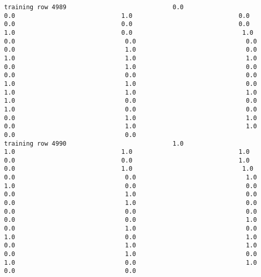 \documentclass[11pt]{article}
\begin{document}
\begin{verbatim}
training row 4989                             0.0                             0.0                             1.0                             0.0                             0.0                             0.0                             0.0                             1.0                             0.0                              1.0                              0.0                              0.0                              0.0                              0.0                              1.0                              0.0                              1.0                              1.0                              1.0                              0.0                              1.0                              0.0                              0.0                              0.0                              0.0                              1.0                              1.0                              0.0                              1.0                              1.0                              1.0                              1.0                              0.0                              0.0                              1.0                              0.0                              0.0                              0.0                              1.0                              1.0                              0.0                              1.0                              1.0                              0.0                              0.0
training row 4990                             1.0                             1.0                             1.0                             1.0                             0.0                             0.0                             1.0                             0.0                             1.0                              1.0                              0.0                              0.0                              1.0                              1.0                              0.0                              0.0                              0.0                              1.0                              0.0                              0.0                              1.0                              0.0                              0.0                              0.0                              0.0                              0.0                              0.0                              1.0                              0.0                              1.0                              0.0                              1.0                              0.0                              1.0                              0.0                              1.0                              1.0                              0.0                              1.0                              0.0                              1.0                              0.0                              1.0                              0.0                              0.0

\end{verbatim}
\end{document}
